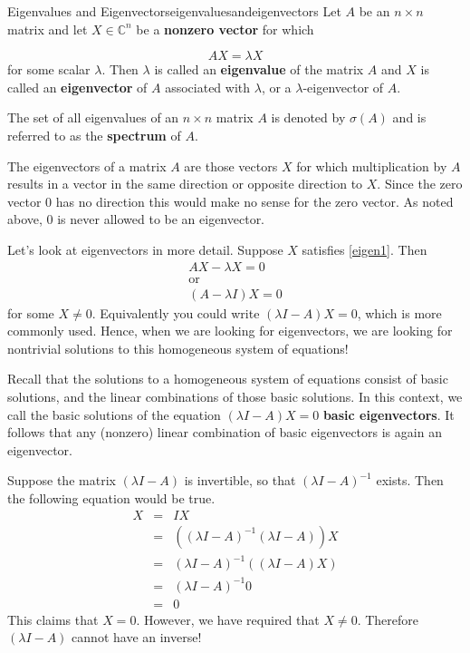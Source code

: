 \begin{definition}{Eigenvalues and Eigenvectors}{eigenvaluesandeigenvectors}
Let $A$ be an $n\times n$ matrix and let $X \in \mathbb{C}^{n}$ be a
\textbf{nonzero vector} for which

\begin{equation}
AX=\lambda X  \label{eigen1}
\end{equation}
for some scalar $\lambda .$ Then $\lambda $ is called an
\textbf{eigenvalue} of the matrix $A$ and $X$ is called an \textbf{eigenvector} of $A$ associated with $\lambda$, or a $\lambda$-eigenvector of $A$. 
 
The set of all eigenvalues of an $n\times n$ matrix $A$ is denoted by 
$\sigma \left( A\right) $ and is referred to as the \textbf{spectrum}
 of $A.$
\end{definition}

The eigenvectors of a matrix $A$ are those vectors $X$ for which
multiplication by $A$ results in a vector in the same direction or opposite
direction to $X$. Since the zero vector $0$ has no
direction this would make no sense for the zero vector. As noted above, 
$0$ is never allowed to be an eigenvector. 

Let's look at eigenvectors in more detail. Suppose $X$ satisfies \ref{eigen1}. Then
\begin{equation*}
\begin{array}{c}
AX - \lambda X = 0 \\
\mbox{or} \\
\left( A-\lambda I\right) X = 0
\end{array}
\end{equation*}
for some $X \neq 0.$ Equivalently you could write $\left( \lambda
I-A\right)X = 0$, which is more commonly used.  Hence, when we are looking for eigenvectors, we are
looking for nontrivial solutions to this homogeneous system of equations!

Recall that the solutions to a homogeneous system of equations consist
of basic solutions, and the linear combinations of those basic
solutions. In this context, we call the basic solutions of the
equation $\left( \lambda I - A\right) X = 0$ \textbf{basic
eigenvectors}. It follows that any (nonzero) linear combination of basic
eigenvectors is again an eigenvector.

Suppose the matrix $\left(\lambda I - A\right)$ is invertible, so that
$\left(\lambda I - A\right)^{-1}$ exists.
Then the following equation would be true.
\begin{eqnarray*}
X &=& IX \\
&=& \left( \left( \lambda I - A\right) ^{-1}\left(\lambda I - A \right)
\right) X \\
&=&\left( \lambda I - A\right) ^{-1}\left( \left( \lambda
I - A\right) X\right) \\
&=& \left( \lambda I - A\right) ^{-1}0 \\
&=& 0
\end{eqnarray*}
This claims that $X=0$. However, we have required that $ X \neq 0$. Therefore  $\left(\lambda I - A\right)$
cannot have an inverse! 

